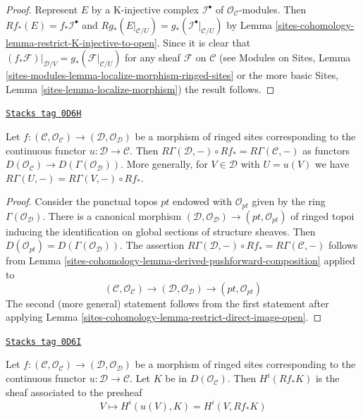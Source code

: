 \begin{proof}
Represent $E$ by a K-injective complex $\mathcal{I}^\bullet$ of
$\mathcal{O}_\mathcal{C}$-modules. Then
$Rf_*(E) = f_*\mathcal{I}^\bullet$
and $Rg_*(E|_{\mathcal{C}/U}) = g_*(\mathcal{I}^\bullet|_{\mathcal{C}/U})$ by
Lemma \ref{sites-cohomology-lemma-restrict-K-injective-to-open}.
Since it is clear that
$(f_*\mathcal{F})|_{\mathcal{D}/V} = g_*(\mathcal{F}|_{\mathcal{C}/U})$
for any sheaf $\mathcal{F}$ on $\mathcal{C}$
(see Modules on Sites, Lemma
\ref{sites-modules-lemma-localize-morphism-ringed-sites} or the more basic
Sites, Lemma \ref{sites-lemma-localize-morphism})
the result follows.
\end{proof}

\begin{lemma}
\label{sites-cohomology-lemma-Leray-unbounded}
\href{https://stacks.math.columbia.edu/tag/0D6H}{\texttt{Stacks tag 0D6H}}

Let $f : (\mathcal{C}, \mathcal{O}_\mathcal{C}) \to
(\mathcal{D}, \mathcal{O}_\mathcal{D})$ be a morphism of ringed sites
corresponding to the continuous functor $u : \mathcal{D} \to \mathcal{C}$.
Then $R\Gamma(\mathcal{D}, -) \circ Rf_* = R\Gamma(\mathcal{C}, -)$ as
functors $D(\mathcal{O}_\mathcal{C}) \to D(\Gamma(\mathcal{O}_\mathcal{D}))$.
More generally, for $V \in \mathcal{D}$ with $U = u(V)$
we have $R\Gamma(U, -) = R\Gamma(V, -) \circ Rf_*$.
\end{lemma}

\begin{proof}
Consider the punctual topos $pt$ endowed with $\mathcal{O}_{pt}$
given by the ring $\Gamma(\mathcal{O}_\mathcal{D})$.
There is a canonical morphism
$(\mathcal{D}, \mathcal{O}_\mathcal{D}) \to (pt, \mathcal{O}_{pt})$
of ringed topoi inducing the identification on global sections of
structure sheaves. Then
$D(\mathcal{O}_{pt}) = D(\Gamma(\mathcal{O}_\mathcal{D}))$.
The assertion
$R\Gamma(\mathcal{D}, -) \circ Rf_* = R\Gamma(\mathcal{C}, -)$
follows from Lemma \ref{sites-cohomology-lemma-derived-pushforward-composition}
applied to
$$
(\mathcal{C}, \mathcal{O}_\mathcal{C}) \to
(\mathcal{D}, \mathcal{O}_\mathcal{D}) \to (pt, \mathcal{O}_{pt})
$$
The second (more general) statement follows from the first statement
after applying Lemma \ref{sites-cohomology-lemma-restrict-direct-image-open}.
\end{proof}

\begin{lemma}
\label{sites-cohomology-lemma-unbounded-describe-higher-direct-images}
\href{https://stacks.math.columbia.edu/tag/0D6I}{\texttt{Stacks tag 0D6I}}

Let $f : (\mathcal{C}, \mathcal{O}_\mathcal{C}) \to
(\mathcal{D}, \mathcal{O}_\mathcal{D})$ be a morphism of ringed sites
corresponding to the continuous functor $u : \mathcal{D} \to \mathcal{C}$.
Let $K$ be in $D(\mathcal{O}_\mathcal{C})$. Then $H^i(Rf_*K)$ is the sheaf
associated to the presheaf
$$
V \mapsto H^i(u(V), K) = H^i(V, Rf_*K)
$$
\end{lemma}

